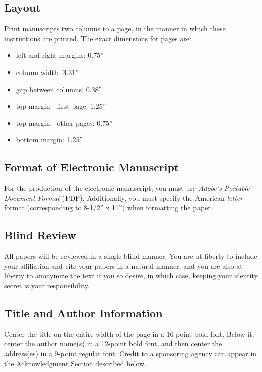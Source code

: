\documentclass[letterpaper]{article}
\begin{document}
\subsection{Layout}

Print manuscripts two columns to a page, in the manner in which these instructions are printed. The exact dimensions for pages are:
\begin{itemize}
\item left and right margins: 0.75''
\item column width: 3.31''
\item gap between columns: 0.38''
\item top margin—first page: 1.25''
\item top margin—other pages: 0.75''
\item bottom margin: 1.25''
\end{itemize}

\subsection{Format of Electronic Manuscript}

For the production of the electronic manuscript, you must use {\em Adobe's Portable Document Format} (PDF). Additionally, you must specify the American {\em letter} format (corresponding to 8-1/2'' x 11'') when formatting the paper.

\subsection{Blind Review}

All papers will be reviewed in a single blind manner.  You are at liberty to include your affiliation and cite your papers in a natural manner, and you are also at liberty to anonymize the text if you so desire, in which case, keeping your identity secret is your responsibility.

\subsection{Title and Author Information}

Center the title on the entire width of the page in a 16-point bold font. Below it, center the author name(s) in a 12-point bold font, and then center the address(es) in a 9-point regular font. Credit to a sponsoring agency can appear in the Acknowledgment Section described below.
\end{document}
